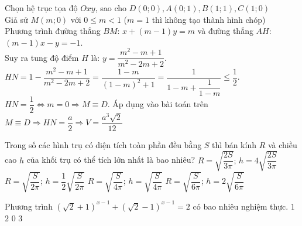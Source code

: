 \begin{ex}
{{		}
		Chọn hệ trục tọa độ $Oxy$, sao cho $D\left(0;0\right),A\left(0;1\right),B\left(1;1\right),C\left(1;0\right)$\\
		Giả sử $M\left(m;0\right)$ với $0\le m<1$ ($m=1$ thì không tạo thành hình chóp)\\
		Phương trình đường thẳng $BM$: $x+\left(m-1\right)y=m$ và đường thẳng
		$AH$: $\left(m-1\right)x-y=-1$.\\
		Suy ra tung độ điểm $H$ là: $y=\dfrac{m^2-m+1}{m^2-2m+2}$.\\ 
		$HN=1-\dfrac{m^2-m+1}{m^2-2m+2}=\dfrac{1-m}{{\left(1-m\right)}^2+1}=\dfrac{1}{1-m+\dfrac{1}{1-m}}\le \dfrac{1}{2}$.\\
		$HN=\dfrac{1}{2}\Leftrightarrow m=0\Rightarrow M\equiv D$.
		Áp dụng vào bài toán trên $M\equiv D\Rightarrow HN=\dfrac{a}{2}\Rightarrow V=\dfrac{a^3\sqrt{2}}{12}$ 
	}
\end{ex}
\begin{ex}%
	Trong số các hình trụ có diện tích toàn phần đều bằng $S$  thì bán kính $R$  và chiều cao $h$  của khối trụ có thể tích lớn nhất là bao nhiêu?
	\choice
	{$R=\sqrt{\dfrac{2S}{3\pi}}$; $h=4\sqrt{\dfrac{2S}{3\pi}}$}
	{$R=\sqrt{\dfrac{S}{2\pi}}$; $h=\dfrac{1}{2}\sqrt{\dfrac{S}{2\pi}}$}
	{$R=\sqrt{\dfrac{S}{4\pi}}$; $h=\sqrt{\dfrac{S}{4\pi}}$}
	{\True $R=\sqrt{\dfrac{S}{6\pi}}$; $h=2\sqrt{\dfrac{S}{6\pi}}$}
\end{ex}
\begin{ex}%
	Phương trình $\left(\sqrt{2}+1 \right)^{x-1}+\left(\sqrt{2}-1 \right)^{x-1}=2$ có bao nhiêu nghiệm thực.
	\choice
	{\True $1$}
	{$2$}
	{$0$}
	{$3$}
\end{ex}
